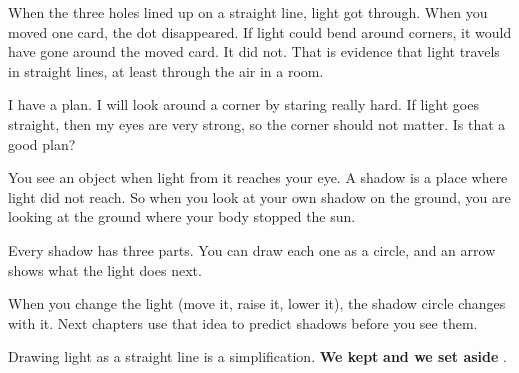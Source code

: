 When the three holes lined up on a straight line, light got through. When you moved one card, the dot disappeared. If light could bend around corners, it would have gone around the moved card. It did not. That is evidence that light travels in straight lines, at least through the air in a room.

\begin{multix}[hmm]\multixbot[hmm]\tcblower
I have a plan. I will look around a corner by staring really hard. If light goes straight, then my eyes are very strong, so the corner should not matter. Is that a good plan?
\end{multix}

You see an object when light from it reaches your eye. A shadow is a place where light did not reach. So when you look at your own shadow on the ground, you are looking at the ground where your body stopped the sun.

Every shadow has three parts. You can draw each one as a circle, and an arrow shows what the light does next.

\begin{center}
\end{center}

When you change the light (move it, raise it, lower it), the shadow circle changes with it. Next chapters use that idea to predict shadows before you see them.

\begin{keepbox}
Drawing light as a straight line is a simplification. \textbf{We kept} \wline[3.4cm] \textbf{and we set aside} \wline[3.4cm].
\end{keepbox}

